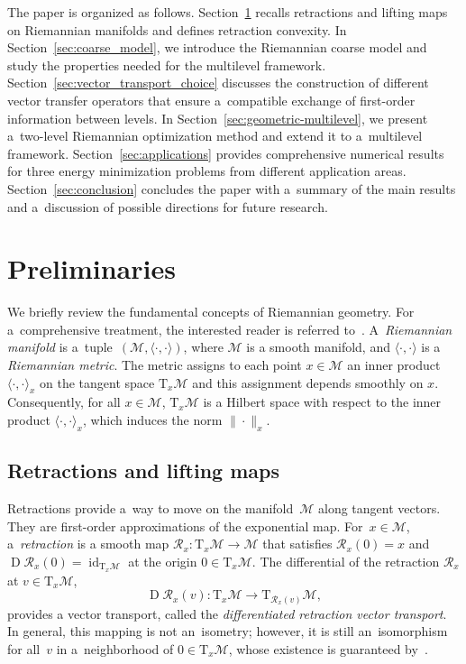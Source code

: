 \documentclass[11pt,reqno]{amsart}
\theoremstyle{plain}
\DeclareMathOperator{\Drm}{D}
\DeclareMathOperator{\id}{id}
\newcommand{\M}{\mathcal{M}}
\newcommand{\Tan}{\mathrm{T}}
\newcommand{\Ret}{\mathcal R}
\begin{document}
	The paper is organized as follows.
	Section~\ref{sec:fundam} recalls retractions and lifting maps on Riemannian manifolds and defines retraction convexity.
	In Section~\ref{sec:coarse_model}, 
	we introduce the Riemannian coarse model and study the properties needed for the multilevel framework. Section~\ref{sec:vector_transport_choice} discusses the construction of different vector transfer operators that ensure a~compatible 
	exchange of first-order information between levels.
	In Section~\ref{sec:geometric-multilevel}, we present a~two-level Riemannian optimization method and extend it to a~multilevel framework.
	Section~\ref{sec:applications} provides comprehensive numerical results for three energy minimization problems from different application areas.
	Section~\ref{sec:conclusion} concludes the paper with a~summary of the main results and a~discussion of possible directions for future research.
	
	
	\section{Preliminaries}
	\label{sec:fundam}
	We briefly review the fundamental concepts of Riemannian geometry. For a~comprehensive treatment, the interested reader is referred to~\cite{AbsMS08,Boumal23}.
	A~\emph{Riemannian manifold} is a~tuple~$(\M, \langle\cdot,\cdot\rangle)$, where $\M$ is a smooth manifold, and $\langle\cdot,\cdot\rangle$ is a \emph{Riemannian metric}. The metric assigns to each point $x \in \M$ an inner product $\langle\cdot, \cdot\rangle_x$ on the tangent space $\Tan_x\M$ and this assignment depends smoothly on $x$. Consequently, for all $x \in \M$, $\Tan_x\M$ is a Hilbert space with respect to the inner product $\langle\cdot, \cdot\rangle_x$, which induces the norm $\|\cdot\|_x$.
	
	\subsection{Retractions and lifting maps}
	
	Retractions provide a~way to move on the manifold~$\M$ along tangent vectors. They are first-order approximations of the exponential map. For~\mbox{$x\in\M$}, a~\emph{retraction} is a smooth map $\Ret_x \colon \Tan_x\M \to \M$ that satisfies $\Ret_x(0) = x$ and $\Drm \Ret_x(0) = \id_{\Tan_x\M}$ at the origin $0 \in \Tan_x\M$.
	The differential of the retraction $\Ret_x$ at $v\in\Tan_x\M$,  
	\begin{equation*}
		\Drm \Ret_x(v) \colon \Tan_x\M \to \Tan_{\Ret_x(v)}\M, 
	\end{equation*}
	provides a vector transport, called the \emph{differentiated retraction vector transport}. In general, this mapping is not an~isometry; however, it is still an~isomorphism for all~$v$ in a~neighborhood of $0 \in \Tan_x\M$, whose existence is guaranteed by~\cite[Cor.~10.27]{Boumal23}. 
	
\end{document}
